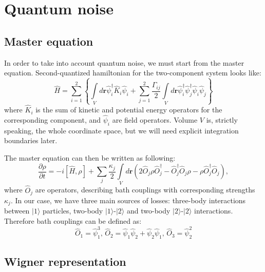 \documentclass[12pt,notitlepage]{report}
\begin{document}
\section*{Quantum noise}

\subsection*{Master equation}

In order to take into account quantum noise, we must start from the master equation.
Second-quantized hamiltonian for the two-component system looks like:
\[
\hat{H} = \sum\limits^2_{i=1} \left\{ \int\limits_V d\mathbf{r} \hat{\psi}_i^\dagger \hat{K}_i \hat{\psi}_i +
\sum\limits^2_{j=1} \frac{\Gamma_{ij}}{2} \int\limits_V d\mathbf{r} \hat{\psi}_i^\dagger \hat{\psi}_j^\dagger \hat{\psi}_i \hat{\psi}_j \right\}
\]
where $\hat{K}_i$ is the sum of kinetic and potential energy operators for the corresponding component,
and $\hat{\psi}_i$ are field operators.
Volume $V$ is, strictly speaking, the whole coordinate space, but we will need explicit integration boundaries later.

The master equation can then be written as following:
\[
\frac{\partial\rho}{\partial t} = -i [\hat{H}, \rho] + \sum\limits_j \frac{\kappa_j}{2} \int\limits_V d\mathbf{r}
\left( 2  \hat{O}_j \rho \hat{O}_j^\dagger - \hat{O}_j^\dagger \hat{O}_j \rho - \rho \hat{O}_j^\dagger \hat{O}_j \right),
\]
where $\hat{O}_j$ are operators, describing bath couplings with corresponding strengths $\kappa_j$.
In our case, we have three main sources of losses: three-body interactions between $\vert1\rangle$ particles,
two-body $\vert1\rangle$-$\vert2\rangle$ and two-body $\vert2\rangle$-$\vert2\rangle$ interactions.
Therefore bath couplings can be defined as:
\begin{equation}
\label{bath_coupling_operators}
\hat{O}_1 = \hat{\psi}_1^3,\, \hat{O}_2 = \hat{\psi}_1 \hat{\psi}_2 + \hat{\psi}_2 \hat{\psi}_1,\, \hat{O}_3 = \hat{\psi}_2^2
\end{equation}

\subsection*{Wigner representation}
\end{document}

